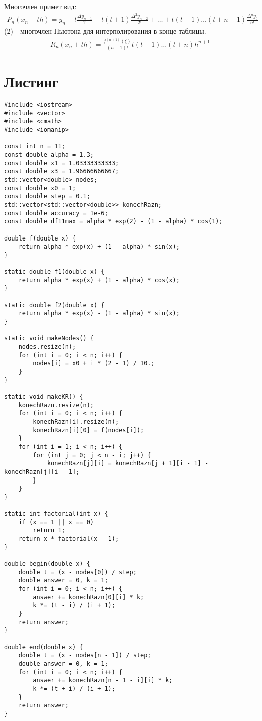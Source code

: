 \documentclass[10pt]{scrartcl}
\makeatletter
\newcommand{\verbatimfont}[1]{\renewcommand{\verbatim@font}{\ttfamily#1}}
\makeatother
\begin{document}
Многочлен примет вид:
\begin{gather}
P_n(x_n - th) = y_n + t\frac{\Delta y_{n - 1}}{1!} + t(t + 1)\frac{\Delta^2 y_{n - 2}}{2!} + \dots +
t(t + 1)\dots(t + n - 1)\frac{\Delta^n y_0}{n!}
\end{gather}
(2) - многочлен Ньютона для интерполирования в конце таблицы.
\begin{gather*}
R_n(x_n + th) = \frac{f^{(n + 1)}(\xi)}{(n + 1)!}t(t + 1)\dots(t + n)h^{n + 1}
\end{gather*}
\section*{Листинг}
\verbatimfont{\small}
\begin{verbatim}
#include <iostream>
#include <vector>
#include <cmath>
#include <iomanip>

const int n = 11;
const double alpha = 1.3;
const double x1 = 1.03333333333;
const double x3 = 1.96666666667;
std::vector<double> nodes;
const double x0 = 1;
const double step = 0.1;
std::vector<std::vector<double>> konechRazn;
const double accuracy = 1e-6;
const double df11max = alpha * exp(2) - (1 - alpha) * cos(1);

double f(double x) {
    return alpha * exp(x) + (1 - alpha) * sin(x);
}

static double f1(double x) {
    return alpha * exp(x) + (1 - alpha) * cos(x);
}

static double f2(double x) {
    return alpha * exp(x) - (1 - alpha) * sin(x);
}

static void makeNodes() {
    nodes.resize(n);
    for (int i = 0; i < n; i++) {
        nodes[i] = x0 + i * (2 - 1) / 10.;
    }
}

static void makeKR() {
    konechRazn.resize(n);
    for (int i = 0; i < n; i++) {
        konechRazn[i].resize(n);
        konechRazn[i][0] = f(nodes[i]);
    }
    for (int i = 1; i < n; i++) {
        for (int j = 0; j < n - i; j++) {
            konechRazn[j][i] = konechRazn[j + 1][i - 1] - konechRazn[j][i - 1];
        }
    }
}

static int factorial(int x) {
    if (x == 1 || x == 0)
        return 1;
    return x * factorial(x - 1);
}

double begin(double x) {
    double t = (x - nodes[0]) / step;
    double answer = 0, k = 1;
    for (int i = 0; i < n; i++) {
        answer += konechRazn[0][i] * k;
        k *= (t - i) / (i + 1);
    }
    return answer;
}

double end(double x) {
    double t = (x - nodes[n - 1]) / step;
    double answer = 0, k = 1;
    for (int i = 0; i < n; i++) {
        answer += konechRazn[n - 1 - i][i] * k;
        k *= (t + i) / (i + 1);
    }
    return answer;
}


\end{verbatim}
\end{document}
